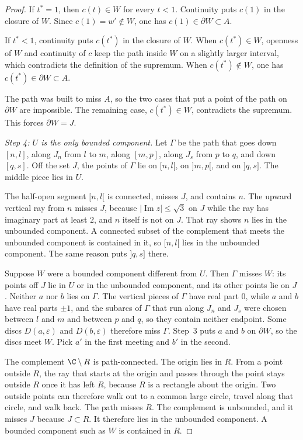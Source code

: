 \begin{proof}
If $t^*=1$, then $c(t)\in W$ for every $t<1$. Continuity puts $c(1)$ in the closure of $W$. Since $c(1)=w'\notin W$, one has $c(1)\in\partial W\subset A$.

If $t^*<1$, continuity puts $c(t^*)$ in the closure of $W$. When $c(t^*)\in W$, openness of $W$ and continuity of $c$ keep the path inside $W$ on a slightly larger interval, which contradicts the definition of the supremum. When $c(t^*)\notin W$, one has $c(t^*)\in\partial W\subset A$.

The path was built to miss $A$, so the two cases that put a point of the path on $\partial W$ are impossible. The remaining case, $c(t^*)\in W$, contradicts the supremum. This forces $\partial W=J$.

\emph{Step 4: $U$ is the only bounded component.} Let $\Gamma$ be the path that goes down $[n,l]$, along $J_n$ from $l$ to $m$, along $[m,p]$, along $J_s$ from $p$ to $q$, and down $[q,s]$. Off the set $J$, the points of $\Gamma$ lie on $[n,l[$, on $]m,p[$, and on $]q,s]$. The middle piece lies in $U$.

The half-open segment $[n,l[$ is connected, misses $J$, and contains $n$. The upward vertical ray from $n$ misses $J$, because $|\operatorname{Im} z|\le\sqrt3$ on $J$ while the ray has imaginary part at least $2$, and $n$ itself is not on $J$. That ray shows $n$ lies in the unbounded component. A connected subset of the complement that meets the unbounded component is contained in it, so $[n,l[$ lies in the unbounded component. The same reason puts $]q,s]$ there.

Suppose $W$ were a bounded component different from $U$. Then $\Gamma$ misses $W$: its points off $J$ lie in $U$ or in the unbounded component, and its other points lie on $J$. Neither $a$ nor $b$ lies on $\Gamma$. The vertical pieces of $\Gamma$ have real part $0$, while $a$ and $b$ have real parts $\pm1$, and the subarcs of $\Gamma$ that run along $J_n$ and $J_s$ were chosen between $l$ and $m$ and between $p$ and $q$, so they contain neither endpoint. Some discs $D(a,\varepsilon)$ and $D(b,\varepsilon)$ therefore miss $\Gamma$. Step~3 puts $a$ and $b$ on $\partial W$, so the discs meet $W$. Pick $a'$ in the first meeting and $b'$ in the second.

The complement $\C\setminus R$ is path-connected. The origin lies in $R$. From a point outside $R$, the ray that starts at the origin and passes through the point stays outside $R$ once it has left $R$, because $R$ is a rectangle about the origin. Two outside points can therefore walk out to a common large circle, travel along that circle, and walk back. The path misses $R$. The complement is unbounded, and it misses $J$ because $J\subset R$. It therefore lies in the unbounded component. A bounded component such as $W$ is contained in $R$.


\end{proof}
